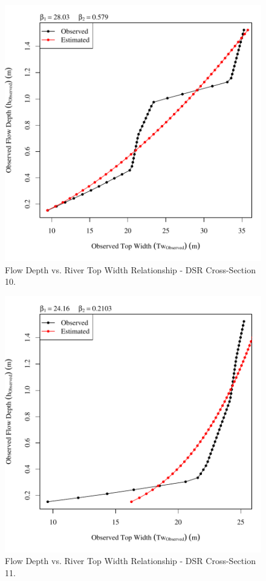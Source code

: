 \begin{center}
\begin{figure}[htbp]
	\includegraphics[width=6in]{"Figures/Results_DSR/Survey Tw vs H-Section 10"}
	\caption{Flow Depth vs. River Top Width Relationship - DSR Cross-Section 10.}
\end{figure}
\end{center}
\newpage

\begin{center}
\begin{figure}[htbp]
	\includegraphics[width=6in]{"Figures/Results_DSR/Survey Tw vs H-Section 11"}
	\caption{Flow Depth vs. River Top Width Relationship - DSR Cross-Section 11.}
\end{figure}
\end{center}
\newpage


